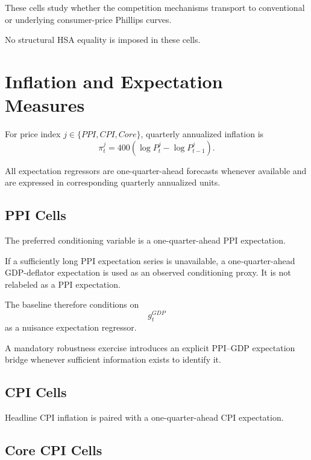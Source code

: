 \documentclass[11pt]{article}
\begin{document}
These cells study whether the competition mechanisms transport to conventional or underlying consumer-price Phillips curves.

No structural HSA equality is imposed in these cells.

\section{Inflation and Expectation Measures}

For price index \(j\in\{PPI,CPI,Core\}\), quarterly annualized inflation is
\begin{equation}
\pi_t^j
=
400
\left(
\log P_t^j-\log P_{t-1}^j
\right).
\label{eq:inflation_general}
\end{equation}

All expectation regressors are one-quarter-ahead forecasts whenever available and are expressed in corresponding quarterly annualized units.

\subsection{PPI Cells}

The preferred conditioning variable is a one-quarter-ahead PPI expectation.

If a sufficiently long PPI expectation series is unavailable, a one-quarter-ahead GDP-deflator expectation is used as an observed conditioning proxy. It is not relabeled as a PPI expectation.

The baseline therefore conditions on
\begin{equation}
g_t^{GDP}
\end{equation}
as a nuisance expectation regressor.

A mandatory robustness exercise introduces an explicit PPI--GDP expectation bridge whenever sufficient information exists to identify it.

\subsection{CPI Cells}

Headline CPI inflation is paired with a one-quarter-ahead CPI expectation.

\subsection{Core CPI Cells}
\end{document}
